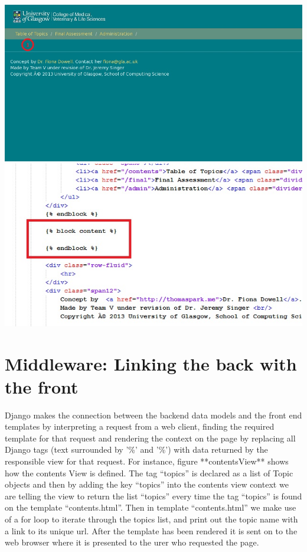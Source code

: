 \documentclass{l3proj}
\begin{document}
{\includegraphics[width=\linewidth]{images/base.jpg}
\includegraphics[width=\linewidth]{images/baseblock.jpg}
\section{Middleware: Linking the back with the front}
Django makes the connection between the backend data models and the front end templates by interpreting a request from a web client, finding the required template for that request and rendering the context on the page by replacing all Django tags (text surrounded by '{\%' and  '\%}') with data returned by the responsible view for that request.  For  instance, figure **contentsView** shows how the contents View is defined. The tag “topics” is declared as a list of Topic objects and then by adding the key “topics” into the contents view context we are telling the view to return the list “topics” every time the tag “topics” is found on the template “contents.html”. Then in template “contents.html” we make use of a for loop to iterate through the topics list, and print out the topic name with a link to its unique url. After the template has been rendered it is sent on to the web browser where it is presented to the urer who requested the page.
}
\end{document}
